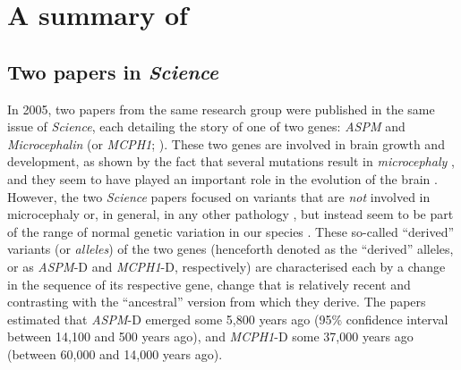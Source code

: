 \documentclass[twoside,onecolumn]{article}
\begin{document}

\section{A summary of \citet{dediu_ladd_2007}} \label{summary_dediu_ladd}

\subsection{Two papers in \textit{Science}}

In 2005, two papers from the same research group were published in the same issue of \textit{Science}, each detailing the story of one of two genes: \textit{ASPM} \citep{mekelbobrov_aspm_2005} and \textit{Microcephalin} (or \textit{MCPH1};  \citealp{evans_microcephalin_2005}).
These two genes are involved in brain growth and development, as shown by the fact that several mutations result in \textit{microcephaly} \citep{cox_microcephaly_2006}, and they seem to have played an important role in the evolution of the brain \citep{ali_positive_2008,montgomery_adaptive_2011,montgomery_microcephaly_2014}.
However, the two \textit{Science} papers focused on variants that are \emph{not} involved in microcephaly or, in general, in any other pathology \citep{mekelbobrov_aspm_2005,evans_microcephalin_2005}, but instead seem to be part of the range of normal genetic variation in our species \citep{jobling_human_2013}.
These so-called ``derived'' variants (or \emph{alleles}) of the two genes (henceforth denoted as the ``derived'' alleles, or as \textit{ASPM}-D and \textit{MCPH1}-D, respectively) are characterised each by a change in the sequence of its respective gene, change that is relatively recent and contrasting with the ``ancestral'' version from which they derive.
The papers estimated that \textit{ASPM}-D emerged some 5,800 years ago (95\% confidence interval between 14,100 and 500 years ago), and \textit{MCPH1}-D some 37,000 years ago (between 60,000 and 14,000 years ago).
\end{document}
